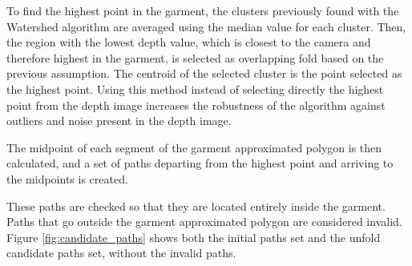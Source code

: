 To find the highest point in the garment, the clusters previously found with the Watershed algorithm are averaged using the median value for each cluster. Then, the region with the lowest depth value, which is closest to the camera and therefore highest in the garment, is selected as overlapping fold based on the previous assumption. The centroid of the selected cluster is the point selected as the highest point. Using this method instead of selecting directly the highest point from the depth image increases the robustness of the algorithm against outliers and noise present in the depth image.

The midpoint of each segment of the garment approximated polygon is then calculated, and a set of paths departing from the highest point and arriving to the midpoints is created.

These paths are checked so that they are located entirely inside the garment. Paths that go outside the garment approximated polygon are considered invalid. Figure \ref{fig:candidate_paths} shows both the initial paths set and the unfold candidate paths set, without the invalid paths.



